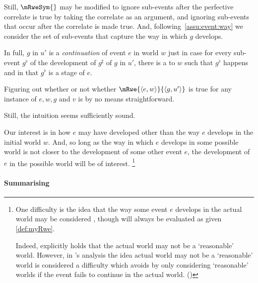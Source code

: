 \begin{note}
{    Still, \(\mRweSym{}\) may be modified to ignore sub-events after the perfective correlate is true by taking the correlate as an argument, and ignoring sub-events that occur after the correlate is made true.
  }
  And, following~\autoref{assu:event:way} we consider the set of sub-events that capture the way in which \(g\) develops.

  In full, \(g\) in \(u'\) is a \emph{ continuation} of event \(e\) in world \(w\) just in case for every sub-event \(g^{\flat}\) of the development of \(g^{\sharp}\) of \(g\) in \(u'\), there is a  to \(w\) such that \(g^{\flat}\) happens and in that  \(g^{\flat}\) is a stage of \(e\).
\end{note}

\begin{note}[Summary]
  Figuring out whether or not whether  \(\mRwe{\langle e,w \rangle}{\langle g,u' \rangle}\) is true for any instance of \(e,w,g\) and \(v\) is by no means straightforward.

  Still, the intuition seems sufficiently sound.

  Our interest is in how \(e\) may have developed other than the way \(e\) develops in the initial world \(w\).
  And, so long as the way in which \(e\) develops in some possible world is not closer to the development of some other event \(e\), the development of \(e\) in the possible world will be of interest.%
  \footnote{
    One difficulty is the idea that the way some event \(e\) develops in the actual world may be considered , though will always be evaluated as  given \autoref{def:myRwe}.

    Indeed, \citeauthor{Landman:1992wh} explicitly holds that the actual world may not be a `reasonable' world.
    However, in \citeauthor{Landman:1992wh}'s analysis the idea actual world may not be a `reasonable' world is considered a difficulty which \citeauthor{Landman:1992wh} avoids by only considering `reasonable' worlds if the event fails to continue in the actual world.
    (\citeyear[Cf.][26]{Landman:1992wh})
  }
\end{note}

\paragraph{Summarising}

